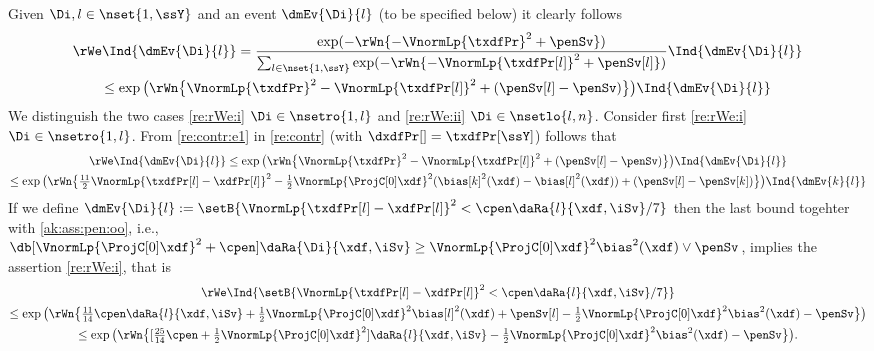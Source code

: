 \begin{pro}
  Given $\Di,l\in\nset{1,\ssY}$ and an event $\dmEv{\Di}{l}$ (to be
  specified below) it clearly follows
  \begin{multline}\label{re:rWe:pro1}
    \rWe\Ind{\dmEv{\Di}{l}}
    =\frac{\exp(-\rWn\{-\VnormLp{\txdfPr}^2+\penSv\})}
    {\sum_{l\in\nset{1,\ssY}}\exp(-\rWn\{-\VnormLp{\txdfPr[l]}^2+\penSv[l]\})}\Ind{\dmEv{\Di}{l}}\\
    \leq
    \exp\big(\rWn\big\{\VnormLp{\txdfPr}^2-\VnormLp{\txdfPr[l]}^2+(\penSv[l]-\penSv)\big\}\big)\Ind{\dmEv{\Di}{l}}
  \end{multline}
  We distinguish the two cases \ref{re:rWe:i} $\Di\in\nsetro{1,l}$ and \ref{re:rWe:ii}
  $\Di\in\nsetlo{l,n}$.  Consider first \ref{re:rWe:i} $\Di\in\nsetro{1,l}$. From
  \ref{re:contr:e1} in \cref{re:contr} (with
  $\dxdfPr[]=\txdfPr[\ssY]$) follows that
  \begin{multline*}%
    \rWe\Ind{\dmEv{\Di}{l}}
    \leq
    \exp\big(\rWn\big\{\VnormLp{\txdfPr}^2-\VnormLp{\txdfPr[l]}^2+(\penSv[l]-\penSv)\big\}\big)\Ind{\dmEv{\Di}{l}}\\
    \leq \exp\big(\rWn\big\{\tfrac{11}{2}\VnormLp{\txdfPr[l]-\xdfPr[l]}^2-\tfrac{1}{2}\VnormLp{\ProjC[0]\xdf}^2(\bias[k]^2(\xdf)-\bias[l]^2(\xdf))+(\penSv[l]-\penSv[k])\big\}\big)\Ind{\dmEv{k}{l}}
  \end{multline*}
  If we define
  $\dmEv{\Di}{l}:=\setB{\VnormLp{\txdfPr[l]-\xdfPr[l]}^2<\cpen\daRa{l}{\xdf,\iSv}/7}$
  then the last bound togehter with \ref{ak:ass:pen:oo}, i.e.,
  $\db[\VnormLp{\ProjC[0]\xdf}^2+\cpen]\daRa{\Di}{\xdf,\iSv}\geq
  \VnormLp{\ProjC[0]\xdf}^2\bias^2(\xdf)\vee\penSv$, implies the
  assertion \ref{re:rWe:i}, that is
  \begin{multline*}
    \rWe\Ind{\setB{\VnormLp{\txdfPr[l]-\xdfPr[l]}^2<\cpen\daRa{l}{\xdf,\iSv}/7}}
    \\\leq\exp\big(\rWn\big\{\tfrac{11}{14}\cpen\daRa{l}{\xdf,\iSv}
    +\tfrac{1}{2}\VnormLp{\ProjC[0]\xdf}^2\bias[l]^2(\xdf) +\penSv[l]
    -\tfrac{1}{2}\VnormLp{\ProjC[0]\xdf}^2\bias^2(\xdf)-\penSv\big\}\big)\\
    \leq\exp\big(\rWn\big\{[\tfrac{25}{14}\cpen+\tfrac{1}{2}\VnormLp{\ProjC[0]\xdf}^2]\daRa{l}{\xdf,\iSv}
    -\tfrac{1}{2}\VnormLp{\ProjC[0]\xdf}^2\bias^2(\xdf)-\penSv\big\}\big).

\end{multline*}
\end{pro}
